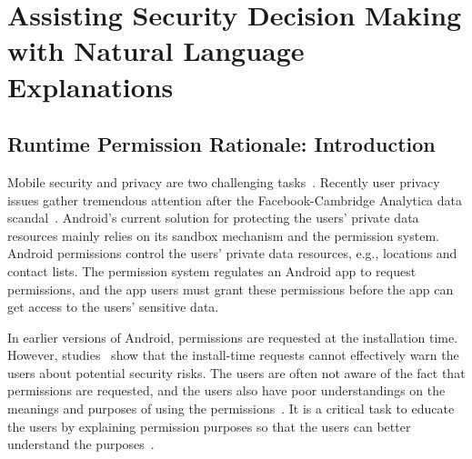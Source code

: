 
\chapter{Assisting Security Decision Making with Natural Language Explanations}
\label{ch:security}

\section{Runtime Permission Rationale: Introduction}
\label{sec:intro}


Mobile security and privacy are two challenging tasks~\cite{journals/tocs/EnckGHTCCJMS14,conf/ccs/FeltCHSW11,conf/soups/FeltHEHCW12,conf/chi/AlmuhimediSSAAG15,conf/huc/LinSALHZ12,conf/soups/LinLSH14,yang2015appcontext}.
Recently user privacy issues gather tremendous attention after the Facebook-Cambridge Analytica data scandal~\cite{facebookleak}. 
Android's current solution for protecting the users' private data resources mainly relies on its sandbox mechanism and the permission system. 
Android permissions control the users' private data resources, e.g., locations and contact lists. 
The permission system regulates an Android app to request permissions, and the app users must grant these permissions before the app can get access to the users' sensitive data. 

In earlier versions of Android, permissions are requested at the installation time.
However, studies~\cite{conf/soups/FeltHEHCW12,conf/huc/LinSALHZ12} show that the install-time requests cannot effectively warn the users about potential security risks. 
The users are often not aware of the fact that permissions are requested, and the users also have poor understandings on the meanings and purposes of using the permissions~\cite{conf/soups/FeltHEHCW12,conf/fc/KelleyCCJSW12}. 
It is a critical task to educate the users by explaining permission purposes so that the users can better understand the purposes~\cite{conf/huc/LinSALHZ12,conf/uss/PanditaXYEX13,clap}.

